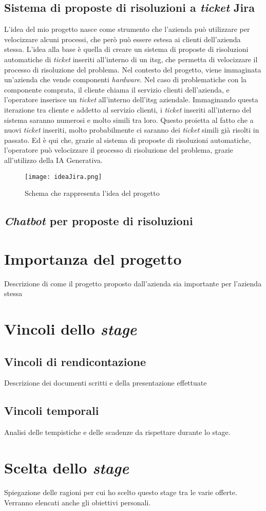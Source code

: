 \subsection{Sistema di proposte di risoluzioni a \textit{ticket} Jira}
L'idea del mio progetto nasce come strumento che l'azienda può utilizzare per velocizzare alcuni processi, che però può essere estesa ai clienti dell'azienda stessa. L'idea alla base è 
quella di creare un sistema di proposte di risoluzioni automatiche di \textit{ticket} inseriti all'interno di un \gls{itsg}, che permetta di velocizzare il processo di risoluzione del problema. Nel contesto del progetto, viene immaginata un'azienda che vende componenti \textit{hardware}. 
Nel caso di problematiche con la componente comprata, il cliente chiama il servizio clienti dell'azienda, e l'operatore inserisce un \textit{ticket} all'interno dell'\gls{itsg} aziendale. Immaginando questa iterazione tra cliente e addetto al servizio clienti, i \textit{ticket} inseriti all'interno del sistema saranno numerosi e molto simili tra loro. 
Questo proietta al fatto che a nuovi \textit{ticket} inseriti, molto probabilmente ci saranno dei \textit{ticket} simili già risolti in passato. Ed è qui che, grazie al sistema di proposte di risoluzioni automatiche, l'operatore può velocizzare il processo di risoluzione del problema, grazie all'utilizzo della IA Generativa.
\begin{figure}[H]
    \centering
    \texttt{[image: ideaJira.png]}
    \caption{Schema che rappresenta l'idea del progetto}
    \label{fig:ideaJira}
\end{figure}
\subsection{\textit{Chatbot} per proposte di risoluzioni}
\section{Importanza del progetto}
Descrizione di come il progetto proposto dall'azienda sia importante per l'azienda stessa

\section{Vincoli dello \textit{stage}}
\subsection{Vincoli di rendicontazione}
Descrizione dei documenti scritti e della presentazione effettuate
\subsection{Vincoli temporali}
Analisi delle tempistiche e delle scadenze da rispettare durante lo stage.


\section{Scelta dello \textit{stage}}
Spiegazione delle ragioni per cui ho scelto questo stage tra le varie offerte.
Verranno elencati anche gli obiettivi personali.
